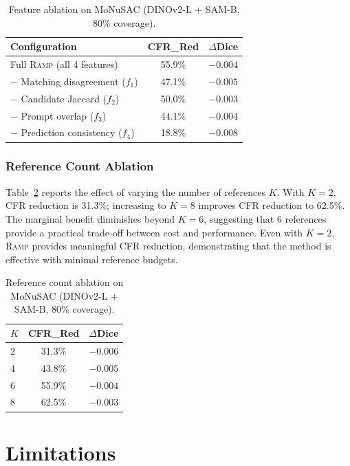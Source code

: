 \documentclass[11pt]{article}
\newcommand{\RAMP}{\textsc{Ramp}}
\begin{document}
\begin{table}[t]
\centering
\caption{Feature ablation on MoNuSAC (DINOv2-L + SAM-B, 80\% coverage).}
\label{tab:featabl}
\begin{tabular}{lcc}
\toprule
Configuration & CFR\_Red & $\Delta$Dice \\
\midrule
Full \RAMP{} (all 4 features) & 55.9\% & $-0.004$ \\
$-$ Matching disagreement ($f_1$) & 47.1\% & $-0.005$ \\
$-$ Candidate Jaccard ($f_2$) & 50.0\% & $-0.003$ \\
$-$ Prompt overlap ($f_3$) & 44.1\% & $-0.004$ \\
$-$ Prediction consistency ($f_4$) & 18.8\% & $-0.008$ \\
\bottomrule
\end{tabular}
\end{table}

\subsubsection{Reference Count Ablation}

Table~\ref{tab:refcount} reports the effect of varying the number of
references $K$. With $K=2$, CFR reduction is 31.3\%; increasing to $K=8$
improves CFR reduction to 62.5\%. The marginal benefit diminishes beyond
$K=6$, suggesting that 6 references provide a practical trade-off between
cost and performance. Even with $K=2$, \RAMP{} provides meaningful CFR
reduction, demonstrating that the method is effective with minimal reference
budgets.

\begin{table}[t]
\centering
\caption{Reference count ablation on MoNuSAC (DINOv2-L + SAM-B, 80\%
  coverage).}
\label{tab:refcount}
\begin{tabular}{lcc}
\toprule
$K$ & CFR\_Red & $\Delta$Dice \\
\midrule
2 & 31.3\% & $-0.006$ \\
4 & 43.8\% & $-0.005$ \\
6 & 55.9\% & $-0.004$ \\
8 & 62.5\% & $-0.003$ \\
\bottomrule
\end{tabular}
\end{table}

\section{Limitations}
\end{document}
